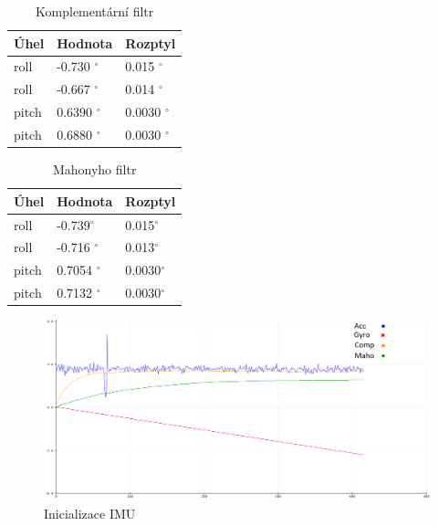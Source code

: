\begin{table}[]
		\centering
	
	\begin{tabular}{|l|l|l|}
		\hline
		\textbf{Úhel} & \textbf{Hodnota} & \textbf{Rozptyl} \\ \hline
		roll          & -0.730 $^\circ$  & 0.015 $^\circ$   \\ \hline
		roll          & -0.667 $^\circ$  & 0.014 $^\circ$   \\ \hline
		pitch         & 0.6390 $^\circ$  & 0.0030 $^\circ$  \\ \hline
		pitch         & 0.6880 $^\circ$  & 0.0030 $^\circ$  \\ \hline
	\end{tabular}
\caption{Komplementární filtr}
\end{table}

\begin{table}[]
			\centering
	\begin{tabular}{|l|l|l|}
		\hline
		\textbf{Úhel} & \textbf{Hodnota} & \textbf{Rozptyl} \\ \hline
		roll          & -0.739$^\circ$   & 0.015$^\circ$    \\ \hline
		roll          & -0.716 $^\circ$  & 0.013$^\circ$    \\ \hline
		pitch         & 0.7054 $^\circ$  & 0.0030$^\circ$   \\ \hline
		pitch         & 0.7132 $^\circ$  & 0.0030$^\circ$   \\ \hline
	\end{tabular}
\caption{Mahonyho filtr}
\end{table}

\begin{figure}[H]
	\centering
	\includegraphics[width=14cm]{pictures/testRoll}
	\caption{Inicializace IMU}
\end{figure}

